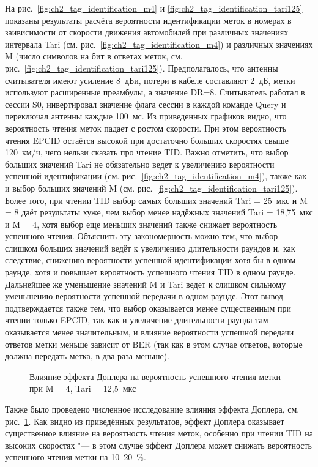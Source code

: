 На рис.~\ref{fig:ch2_tag_identification_m4} и \ref{fig:ch2_tag_identification_tari125} показаны результаты расчёта вероятности идентификации меток в номерах в заивисимости от скорости движения автомобилей при различных значениях интервала Tari (см. рис.~\ref{fig:ch2_tag_identification_m4}) и различных значениях M (число символов на бит в ответах меток, см. рис.~\ref{fig:ch2_tag_identification_tari125}). Предполагалось, что антенны считывателя имеют усиление 8~дБи, потери в кабеле составляют 2~дБ, метки используют расширенные преамбулы, а значение DR=8. Считыватель работал в сессии S0, инвертировал значение флага сессии в каждой команде Query и переключал антенны каждые 100~мс. Из приведенных графиков видно, что вероятность чтения меток падает с ростом скорости. При этом вероятность чтения EPCID остаётся высокой при достаточно больших скоростях свыше 120~км/ч, чего нельзи сказать про чтение TID. Важно отметить, что выбор больших значений Tari не обязательно ведет к увеличению вероятности успешной идентификации (см. рис.~\ref{fig:ch2_tag_identification_m4}), также как и выбор больших значений M (см. рис.~\ref{fig:ch2_tag_identification_tari125}). Более того, при чтении TID выбор самых больших значений Tari = 25~мкс и M = 8 даёт результаты хуже, чем выбор менее надёжных значений Tari = 18,75~мкс и M = 4, хотя выбор еще меньших значений также снижает вероятность успешного чтения. Объяснить эту закономерность можно тем, что выбор слишком больших значений ведёт к увеличению длительности раундов и, как следствие, снижению вероятности успешной идентификации хотя бы в одном раунде, хотя и повышает вероятность успешного чтения TID в одном раунде. Дальнейшее же уменьшение значений M и Tari ведет к слишком сильному уменьшению вероятности успешной передачи в одном раунде. Этот вывод подтверждается также тем, что выбор оказывается менее существенным при чтении только EPCID, так как и увеличение длительности раунда там оказывается менее значительным, и влияние вероятности успешной передачи ответов метки меньше зависит от BER (так как в этом случае ответов, которые должна передать метка, в два раза меньше).

\begin{figure}[h]
	\caption{Влияние эффекта Доплера на вероятность успешного чтения метки при M = 4, Tari = 12,5~мкс}
	\label{fig:ch2_identification_doppler}
\end{figure}

Также было проведено численное исследование влияния эффекта Доплера, см. рис.~\ref{fig:ch2_identification_doppler}. Как видно из приведённых результатов, эффект Доплера оказывает существенное влияние на вероятность чтения меток, особенно при чтении TID на высоких скоростях "--- в этом случае эффект Доплера может снижать вероятность успешного чтения метки на 10--20~\%.

